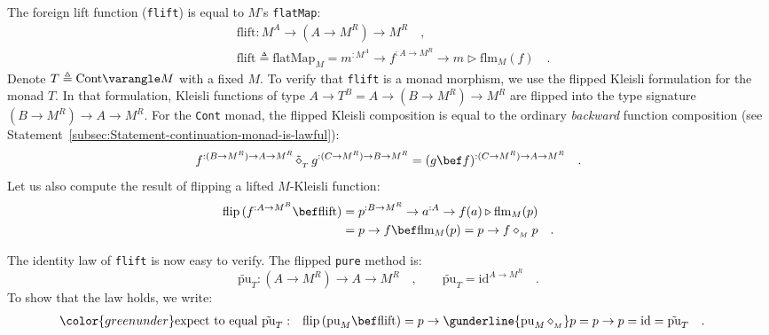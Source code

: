 The foreign lift function (\lstinline!flift!) is equal to $M$\textsf{'}s
\lstinline!flatMap!:
\begin{align*}
 & \text{flift}:M^{A}\rightarrow(A\rightarrow M^{R})\rightarrow M^{R}\quad,\\
 & \text{flift}\triangleq\text{flatMap}_{M}=m^{:M^{A}}\rightarrow f^{:A\rightarrow M^{R}}\rightarrow m\triangleright\text{flm}_{M}(f)\quad.
\end{align*}
Denote $T\triangleq\text{Cont}\varangle M$ with a fixed $M$. To
verify that \lstinline!flift! is a monad morphism, we use the flipped
Kleisli formulation for the monad $T$. In that formulation, Kleisli
functions of type $A\rightarrow T^{B}=A\rightarrow(B\rightarrow M^{R})\rightarrow M^{R}$
are flipped into the type signature $(B\rightarrow M^{R})\rightarrow A\rightarrow M^{R}$.
For the \lstinline!Cont! monad, the flipped Kleisli composition is
equal to the ordinary \emph{backward} function composition (see Statement~\ref{subsec:Statement-continuation-monad-is-lawful}):
\begin{equation}
f^{:(B\rightarrow M^{R})\rightarrow A\rightarrow M^{R}}\,\tilde{\diamond}_{_{T}}\,g^{:(C\rightarrow M^{R})\rightarrow B\rightarrow M^{R}}=(g\bef f)^{:(C\rightarrow M^{R})\rightarrow A\rightarrow M^{R}}\quad.\label{eq:continuation-transformer-derivation1}
\end{equation}
Let us also compute the result of flipping a lifted $M$-Kleisli function:
\begin{align}
\text{flip}\,(f^{:A\rightarrow M^{B}}\bef\text{flift}) & =p^{:B\rightarrow M^{R}}\rightarrow a^{:A}\rightarrow f(a)\triangleright\text{flm}_{M}(p)\nonumber \\
 & =p\rightarrow f\bef\text{flm}_{M}(p)=p\rightarrow f\diamond_{_{M}}p\quad.\label{eq:continuation-transformer-flip-derivation2}
\end{align}

The identity law of \lstinline!flift! is now easy to verify. The
flipped \lstinline!pure! method is:
\[
\tilde{\text{pu}}_{T}:(A\rightarrow M^{R})\rightarrow A\rightarrow M^{R}\quad,\quad\quad\tilde{\text{pu}}_{T}=\text{id}^{A\rightarrow M^{R}}\quad.
\]
To show that the law holds, we write:
\begin{align*}
{\color{greenunder}\text{expect to equal }\tilde{\text{pu}}_{T}:}\quad & \text{flip}\,(\text{pu}_{M}\bef\text{flift})=p\rightarrow\gunderline{\text{pu}_{M}\,\diamond_{_{M}}}p=p\rightarrow p=\text{id}=\tilde{\text{pu}}_{T}\quad.
\end{align*}

